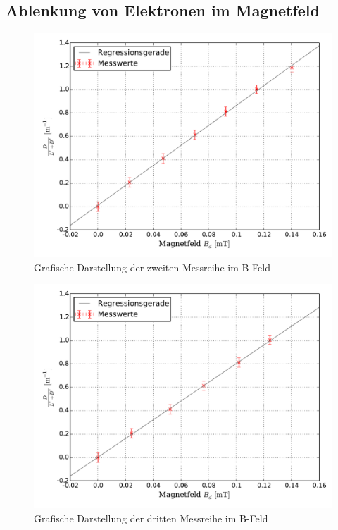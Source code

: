 	\subsection{Ablenkung von Elektronen im Magnetfeld}
		\begin{figure}[!h]
			\centering
			\includegraphics[scale=0.6]{Grafiken/BFeld_Messreihe_II.pdf}
			\caption{Grafische Darstellung der zweiten Messreihe im B-Feld}\label{fig:Auswertung_Messdaten_II_II}
		\end{figure}
		\begin{figure}[!h]
		\centering
			\includegraphics[scale=0.6]{Grafiken/BFeld_Messreihe_III.pdf}
			\caption{Grafische Darstellung der dritten Messreihe im B-Feld}\label{fig:Auswertung_Messdaten_II_III}
		\end{figure}

